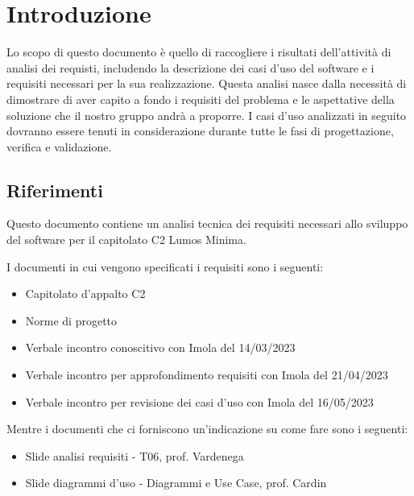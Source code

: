 \documentclass[12pt]{article}
\begin{document}
\section{Introduzione}
Lo scopo di questo documento è quello di raccogliere i risultati dell'attività di analisi dei requisti, includendo la descrizione dei casi d'uso del software e i requisiti necessari per la sua realizzazione.
Questa analisi nasce dalla necessità di dimostrare di aver capito a fondo i requisiti del problema e le aspettative della soluzione che il nostro gruppo andrà a proporre.
I casi d'uso analizzati in seguito dovranno essere tenuti in considerazione durante tutte le fasi di progettazione, verifica e validazione.

\subsection{Riferimenti}
Questo documento contiene un analisi tecnica dei requisiti necessari allo sviluppo del software per il capitolato C2 Lumos Minima.

I documenti in cui vengono specificati i requisiti sono i seguenti:
\begin{itemize}
	\item Capitolato d'appalto C2
	\item Norme di progetto
	\item Verbale incontro conoscitivo con Imola del 14/03/2023
	\item Verbale incontro per approfondimento requisiti con Imola del 21/04/2023
	\item Verbale incontro per revisione dei casi d'uso con Imola del 16/05/2023
\end{itemize}

Mentre i documenti che ci forniscono un'indicazione su come fare sono i seguenti:
\begin{itemize}
	\item Slide analisi requisiti - T06, prof. Vardenega
	\item Slide diagrammi d'uso - Diagrammi e Use Case, prof. Cardin
\end{itemize}
\end{document}
